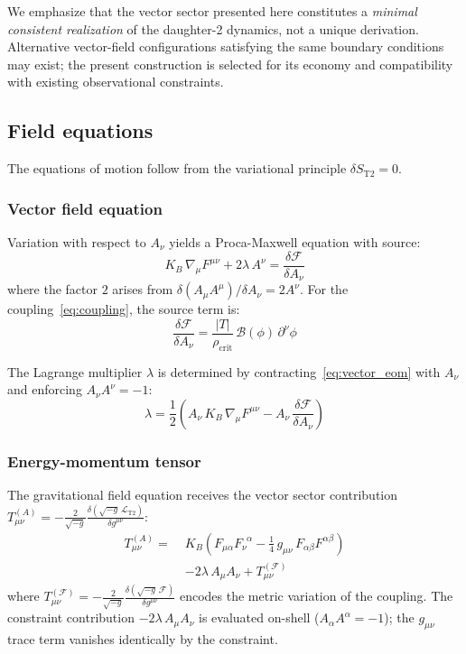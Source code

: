 \documentclass[aps,prd,twocolumn,superscriptaddress,nofootinbib]{revtex4-2}
\begin{document}
We emphasize that the vector sector presented here constitutes a \emph{minimal consistent realization} of the daughter-2 dynamics, not a unique derivation. Alternative vector-field configurations satisfying the same boundary conditions may exist; the present construction is selected for its economy and compatibility with existing observational constraints.

\subsection{Field equations}
\label{sec:field_eqs}

The equations of motion follow from the variational principle $\delta S_{\mathrm{T2}} = 0$.

\subsubsection{Vector field equation}

Variation with respect to $A_\nu$ yields a Proca-Maxwell equation with source:
\begin{equation}
K_B\,\nabla_\mu F^{\mu\nu} + 2\lambda\,A^\nu = \frac{\delta\mathcal{F}}{\delta A_\nu}
\label{eq:vector_eom}
\end{equation}
where the factor $2$ arises from $\delta(A_\mu A^\mu)/\delta A_\nu = 2A^\nu$. For the coupling~\eqref{eq:coupling}, the source term is:
\begin{equation}
\frac{\delta\mathcal{F}}{\delta A_\nu} = \frac{|T|}{\rho_{\mathrm{crit}}}\,\mathcal{B}(\phi)\,\partial^\nu\phi
\label{eq:source}
\end{equation}

The Lagrange multiplier $\lambda$ is determined by contracting~\eqref{eq:vector_eom} with $A_\nu$ and enforcing $A_\nu A^\nu = -1$:
\begin{equation}
\lambda = \frac{1}{2}\left(A_\nu\,K_B\,\nabla_\mu F^{\mu\nu} - A_\nu\,\frac{\delta\mathcal{F}}{\delta A_\nu}\right)
\label{eq:lambda}
\end{equation}

\subsubsection{Energy-momentum tensor}

The gravitational field equation receives the vector sector contribution $T^{(A)}_{\mu\nu} = -\frac{2}{\sqrt{-g}}\frac{\delta(\sqrt{-g}\,\mathcal{L}_{\mathrm{T2}})}{\delta g^{\mu\nu}}$:
\begin{align}
T^{(A)}_{\mu\nu} = \;&K_B\!\left(F_{\mu\alpha}F_\nu^{\phantom{\nu}\alpha} - \tfrac{1}{4}\,g_{\mu\nu}\,F_{\alpha\beta}F^{\alpha\beta}\right) \nonumber\\
&- 2\lambda\,A_\mu A_\nu + T^{(\mathcal{F})}_{\mu\nu}
\label{eq:T_vector}
\end{align}
where $T^{(\mathcal{F})}_{\mu\nu} = -\frac{2}{\sqrt{-g}}\frac{\delta(\sqrt{-g}\,\mathcal{F})}{\delta g^{\mu\nu}}$ encodes the metric variation of the coupling. The constraint contribution $-2\lambda\,A_\mu A_\nu$ is evaluated on-shell ($A_\alpha A^\alpha = -1$); the $g_{\mu\nu}$ trace term vanishes identically by the constraint.
\end{document}
